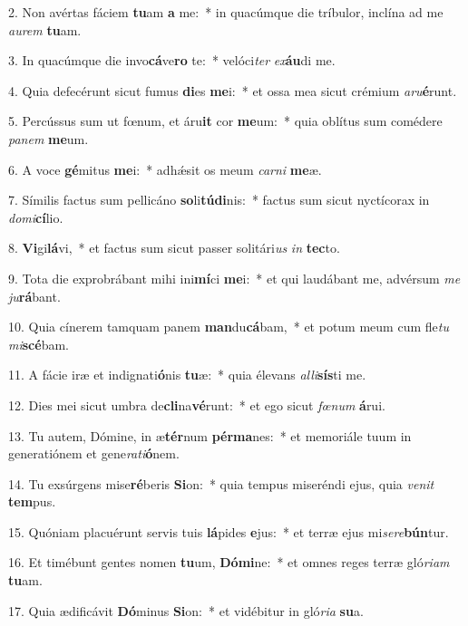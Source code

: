 2. Non avértas fáciem \textbf{tu}am \textbf{a} me:~*  in quacúmque die tríbulor, inclína ad me \textit{au}\textit{rem} \textbf{tu}am.\

3. In quacúmque die invo\textbf{cá}ve\textbf{ro} te:~*  velóci\textit{ter} \textit{ex}\textbf{áu}di me.\

4. Quia defecérunt sicut fumus \textbf{di}es \textbf{me}i:~*  et ossa mea sicut crémium \textit{a}\textit{ru}\textbf{é}runt.\

5. Percússus sum ut fœnum, et áru\textbf{it} cor \textbf{me}um:~*  quia oblítus sum comédere \textit{pa}\textit{nem} \textbf{me}um.\

6. A voce \textbf{gé}mitus \textbf{me}i:~*  adhǽsit os meum \textit{car}\textit{ni} \textbf{me}æ.\

7. Símilis factus sum pellicáno \textbf{so}li\textbf{tú}\textbf{di}nis:~*  factus sum sicut nyctícorax in \textit{do}\textit{mi}\textbf{cí}lio.\

8. \textbf{Vi}gi\textbf{lá}vi,~*  et factus sum sicut passer solitári\textit{us} \textit{in} \textbf{tec}to.\

9. Tota die exprobrábant mihi ini\textbf{mí}ci \textbf{me}i:~*  et qui laudábant me, advérsum \textit{me} \textit{ju}\textbf{rá}bant.\

10. Quia cínerem tamquam panem \textbf{man}du\textbf{cá}bam,~*  et potum meum cum fle\textit{tu} \textit{mi}\textbf{scé}bam.\

11. A fácie iræ et indignati\textbf{ó}nis \textbf{tu}æ:~*  quia élevans \textit{al}\textit{li}\textbf{sís}ti me.\

12. Dies mei sicut umbra de\textbf{cli}na\textbf{vé}runt:~*  et ego sicut \textit{fœ}\textit{num} \textbf{á}rui.\

13. Tu autem, Dómine, in æ\textbf{tér}num \textbf{pér}\textbf{ma}nes:~*  et memoriále tuum in generatiónem et gene\textit{ra}\textit{ti}\textbf{ó}nem.\

14. Tu exsúrgens mise\textbf{ré}beris \textbf{Si}on:~*  quia tempus miseréndi ejus, quia \textit{ve}\textit{nit} \textbf{tem}pus.\

15. Quóniam placuérunt servis tuis \textbf{lá}pides \textbf{e}jus:~*  et terræ ejus mi\textit{se}\textit{re}\textbf{bún}tur.\

16. Et timébunt gentes nomen \textbf{tu}um, \textbf{Dó}\textbf{mi}ne:~*  et omnes reges terræ gló\textit{ri}\textit{am} \textbf{tu}am.\

17. Quia ædificávit \textbf{Dó}minus \textbf{Si}on:~*  et vidébitur in gló\textit{ri}\textit{a} \textbf{su}a.\

